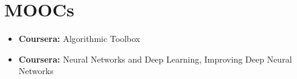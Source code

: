 \documentclass[letterpaper,11pt]{article}
\newcommand{\resumeItem}[2]{
  \item\small{
    \textbf{#1:}{ #2 \vspace{-2pt}}
  }
}
\newcommand{\resumeItemListStart}{\begin{itemize}}
\newcommand{\resumeItemListEnd}{\end{itemize}\vspace{-5pt}}
\begin{document}
\section{MOOCs}
    \resumeItemListStart
        \resumeItem {Coursera}
        {Algorithmic Toolbox}
        \resumeItem {Coursera}
        {Neural Networks and Deep Learning, Improving Deep Neural Networks}
    \resumeItemListEnd



\end{document}
